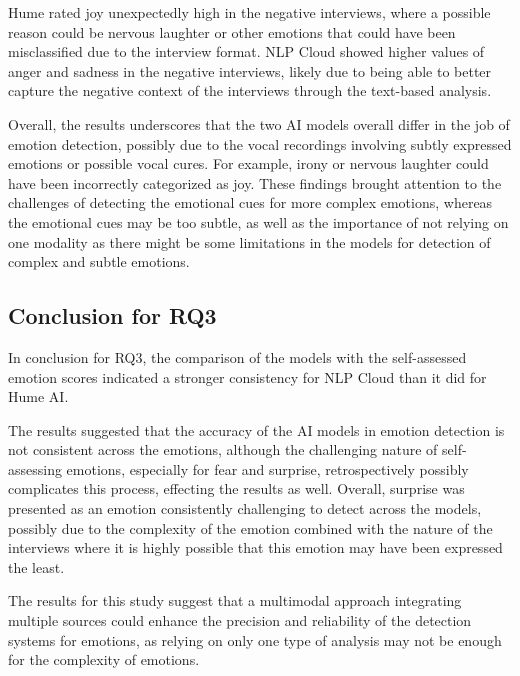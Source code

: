 Hume rated joy unexpectedly high in the negative interviews, where a possible reason could be nervous laughter or other emotions that could have been misclassified due to the interview format. NLP Cloud showed higher values of anger and sadness in the negative interviews, likely due to being able to better capture the negative context of the interviews through the text-based analysis.

Overall, the results underscores that the two AI models overall differ in the job of emotion detection, possibly due to the vocal recordings involving subtly expressed emotions or possible vocal cures. For example, irony or nervous laughter could have been incorrectly categorized as joy. These findings brought attention to the challenges of detecting the emotional cues for more complex emotions, whereas the emotional cues may be too subtle, as well as the importance of not relying on one modality as there might be some limitations in the models for detection of complex and subtle emotions.

\subsection{Conclusion for RQ3}
In conclusion for RQ3, the comparison of the models with the self-assessed emotion scores indicated a stronger consistency for NLP Cloud than it did for Hume AI.

The results suggested that the accuracy of the AI models in emotion detection is not consistent across the emotions, although the challenging nature of self-assessing emotions, especially for fear and surprise, retrospectively possibly complicates this process, effecting the results as well.
Overall, surprise was presented as an emotion consistently challenging to detect across the models, possibly due to the complexity of the emotion combined with the nature of the interviews where it is highly possible that this emotion may have been expressed the least.

The results for this study suggest that a multimodal approach integrating multiple sources could enhance the precision and reliability of the detection systems for emotions, as relying on only one type of analysis may not be enough for the complexity of emotions.
